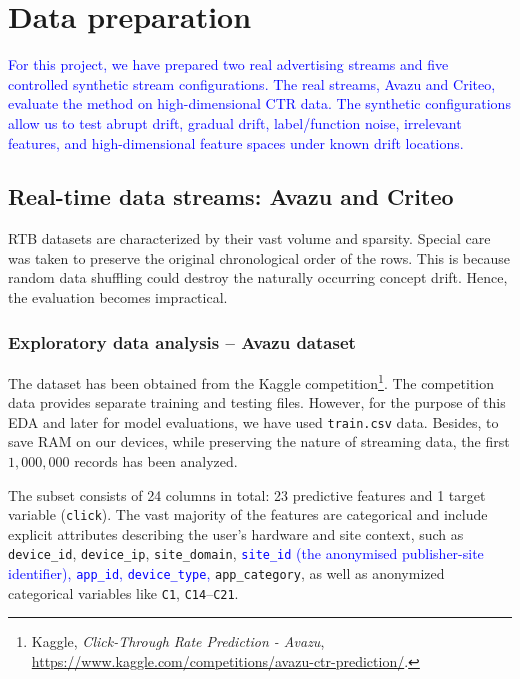 \documentclass[12pt]{article}
\newcommand{\new}[1]{\textcolor{blue}{#1}}
\begin{document}
\section{Data preparation}
\new{For this project, we have prepared two real advertising streams and five controlled synthetic stream configurations. The real streams, Avazu and Criteo, evaluate the method on high-dimensional CTR data. The synthetic configurations allow us to test abrupt drift, gradual drift, label/function noise, irrelevant features, and high-dimensional feature spaces under known drift locations.}

\subsection{Real-time data streams: Avazu and Criteo}

RTB datasets are characterized by their vast volume and sparsity. Special care was taken to preserve the original chronological order of the rows. This is because random data shuffling could destroy the naturally occurring concept drift. Hence, the evaluation becomes impractical.

\subsubsection{Exploratory data analysis -- Avazu dataset}

The dataset has been obtained from the Kaggle competition\footnote{Kaggle, \textit{Click-Through Rate Prediction - Avazu}, \url{https://www.kaggle.com/competitions/avazu-ctr-prediction/}.}. The competition data provides separate training and testing files. However, for the purpose of this EDA and later for model evaluations, we have used \texttt{train.csv} data. Besides, to save RAM on our devices, while preserving the nature of streaming data, the first $1,000,000$ records has been analyzed. 

The subset consists of 24 columns in total: 23 predictive features and 1 target variable (\texttt{click}). The vast majority of the features are categorical and include explicit attributes describing the user's hardware and site context, such as \texttt{device\_id}, \texttt{device\_ip}, \texttt{site\_domain}, \new{\texttt{site\_id} (the anonymised publisher-site identifier), \texttt{app\_id}, \texttt{device\_type},} \texttt{app\_category}, as well as anonymized categorical variables like \texttt{C1}, \texttt{C14}--\texttt{C21}.
\end{document}
